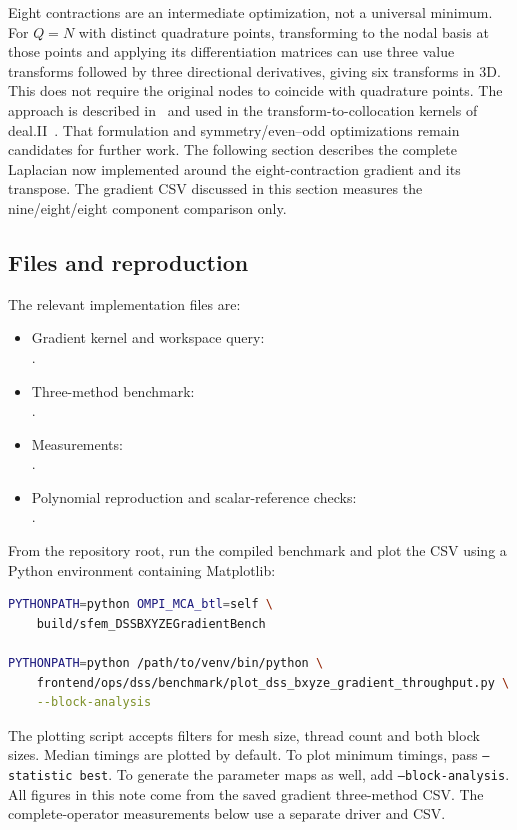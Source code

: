 \documentclass[11pt]{article}
\begin{document}
Eight contractions are an intermediate optimization, not a universal minimum.
For \(Q=N\) with distinct quadrature points, transforming to the nodal basis
at those points and applying its differentiation matrices can use three value
transforms followed by three directional derivatives, giving six transforms in
3D. This does not require the original nodes to coincide with quadrature points.
The approach is described in~\cite{KronbichlerKormann2019} and used in the
transform-to-collocation kernels of deal.II~\cite{dealIIEvaluationKernels}.
That formulation and symmetry/even--odd optimizations remain candidates for
further work. The following section describes the complete Laplacian now
implemented around the eight-contraction gradient and its transpose. The
gradient CSV discussed in this section measures the nine/eight/eight component
comparison only.

\subsection{Files and reproduction}

The relevant implementation files are:
\begin{itemize}
 \item Gradient kernel and workspace query:\\
 {\small{}}.
 \item Three-method benchmark:\\
 {\small{}}.
 \item Measurements:\\
 {\small{}}.
 \item Polynomial reproduction and scalar-reference checks:\\
 {\small{}}.
\end{itemize}

From the repository root, run the compiled benchmark and plot the CSV using a
Python environment containing Matplotlib:
\begin{lstlisting}[language=bash]
PYTHONPATH=python OMPI_MCA_btl=self \
    build/sfem_DSSBXYZEGradientBench

PYTHONPATH=python /path/to/venv/bin/python \
    frontend/ops/dss/benchmark/plot_dss_bxyze_gradient_throughput.py \
    --block-analysis
\end{lstlisting}
The plotting script accepts filters for mesh size, thread count and both block
sizes. Median timings are plotted by default. To plot minimum timings, pass
\texttt{--statistic best}. To generate the parameter maps as well, add
\texttt{--block-analysis}. All figures in this note come from the saved
gradient three-method CSV. The complete-operator measurements below use a
separate driver and CSV.
\end{document}

